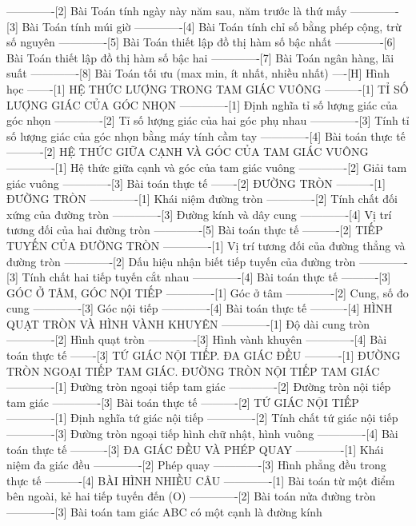 -------------[2] Bài Toán tính ngày này năm sau, năm trước là thứ mấy
-------------[3] Bài Toán tính múi giờ
-------------[4] Bài Toán tính chỉ số bằng phép cộng, trừ số nguyên
-------------[5] Bài Toán thiết lập đồ thị hàm số bậc nhất
-------------[6] Bài Toán thiết lập đồ thị hàm số bậc hai
-------------[7] Bài Toán ngân hàng, lãi suất
-------------[8] Bài Toán tối ưu (max min, ít nhất, nhiều nhất)
----[H] Hình học
-------[1] HỆ THỨC LƯỢNG TRONG TAM GIÁC VUÔNG
----------[1] TỈ SỐ LƯỢNG GIÁC CỦA GÓC NHỌN
-------------[1] Định nghĩa tỉ số lượng giác của góc nhọn
-------------[2] Tỉ số lượng giác của hai góc phụ nhau
-------------[3] Tính tỉ số lượng giác của góc nhọn bằng máy tính cầm tay
-------------[4] Bài toán thực tế
----------[2] HỆ THỨC GIỮA CẠNH VÀ GÓC CỦA TAM GIÁC VUÔNG
-------------[1] Hệ thức giữa cạnh và góc của tam giác vuông
-------------[2] Giải tam giác vuông
-------------[3] Bài toán thực tế
-------[2] ĐƯỜNG TRÒN
----------[1] ĐƯỜNG TRÒN
-------------[1] Khái niệm đường tròn
-------------[2] Tính chất đối xứng của đường tròn
-------------[3] Đường kính và dây cung
-------------[4] Vị trí tương đối của hai đường tròn
-------------[5] Bài toán thực tế
----------[2] TIẾP TUYẾN CỦA ĐƯỜNG TRÒN
-------------[1] Vị trí tương đối của đường thẳng và đường tròn
-------------[2] Dấu hiệu nhận biết tiếp tuyến của đường tròn
-------------[3] Tính chất hai tiếp tuyến cắt nhau
-------------[4] Bài toán thực tế
----------[3] GÓC Ở TÂM, GÓC NỘI TIẾP
-------------[1] Góc ở tâm
-------------[2] Cung, số đo cung
-------------[3] Góc nội tiếp
-------------[4] Bài toán thực tế
----------[4] HÌNH QUẠT TRÒN VÀ HÌNH VÀNH KHUYÊN
-------------[1] Độ dài cung tròn
-------------[2] Hình quạt tròn
-------------[3] Hình vành khuyên
-------------[4] Bài toán thực tế
-------[3] TỨ GIÁC NỘI TIẾP. ĐA GIÁC ĐỀU
----------[1] ĐƯỜNG TRÒN NGOẠI TIẾP TAM GIÁC. ĐƯỜNG TRÒN NỘI TIẾP TAM GIÁC
-------------[1] Đường tròn ngoại tiếp tam giác
-------------[2] Đường tròn nội tiếp tam giác
-------------[3] Bài toán thực tế
----------[2] TỨ GIÁC NỘI TIẾP
-------------[1] Định nghĩa tứ giác nội tiếp
-------------[2] Tính chất tứ giác nội tiếp
-------------[3] Đường tròn ngoại tiếp hình chữ nhật, hình vuông
-------------[4] Bài toán thực tế
----------[3] ĐA GIÁC ĐỀU VÀ PHÉP QUAY
-------------[1] Khái niệm đa giác đều
-------------[2] Phép quay
-------------[3] Hình phẳng đều trong thực tế
----------[4] BÀI HÌNH NHIỀU CÂU
-------------[1] Bài toán từ một điểm bên ngoài, kẻ hai tiếp tuyến đến (O)
-------------[2] Bài toán nửa đường tròn
-------------[3] Bài toán tam giác ABC có một cạnh là đường kính
